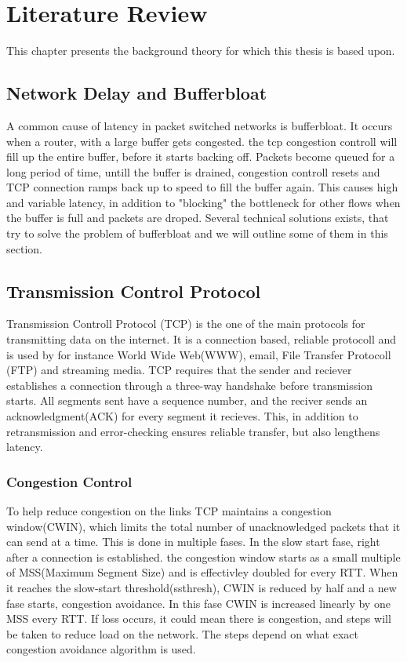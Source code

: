 \chapter{Literature Review}

This chapter presents the background theory for which this thesis is based upon.


\section{Network Delay and Bufferbloat}
A common cause of latency in packet switched networks is bufferbloat. It occurs when a router, with a 
large buffer gets congested. the tcp congestion controll will fill up the entire buffer, before 
it starts backing off. Packets become queued for a long period of time, untill the buffer is drained,
congestion controll resets and TCP connection ramps back up to speed to fill the buffer again.
This causes high and variable latency, in addition to "blocking" the bottleneck for other flows
when the buffer is full and packets are droped. 
Several technical solutions exists, that try to solve the problem of bufferbloat and we will outline 
some of them  in this section.
\section{Transmission Control Protocol}
Transmission Controll Protocol (TCP) is the one of the main protocols for transmitting data on the internet.
It is a connection based, reliable protocoll and is used by for instance World Wide Web(WWW), email, 
File Transfer Protocoll (FTP) and streaming media. TCP requires that the sender and reciever establishes a connection 
through a three-way handshake before transmission starts. All segments sent have a sequence number, and the reciver sends 
an acknowledgment(ACK) for every segment it recieves. This, in addition to retransmission and error-checking ensures
reliable transfer, but also lengthens latency.

\subsection{Congestion Control}
To help reduce congestion on the links TCP maintains a congestion window(CWIN), which limits the total number of 
unacknowledged packets that it can send at a time. This is  done in multiple fases.
In the slow start fase,  right after a connection is established. the congestion window starts as a small multiple 
of MSS(Maximum Segment Size) and is effectivley doubled for every RTT. When it reaches the slow-start threshold(ssthresh),
CWIN is reduced by half and a new fase starts, congestion avoidance. In this fase CWIN is increased linearly by one MSS 
every RTT. If loss occurs, it could mean there is congestion, and steps will be taken to reduce load on the
network. The steps depend on what exact congestion avoidance algorithm is used.

